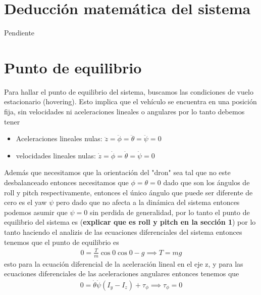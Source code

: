 \documentclass{uofa-eng-assignment}
\begin{document}

\section{Deducción matemática del sistema}
Pendiente 




\section{Punto de equilibrio}
Para hallar el punto de equilibrio del sistema, buscamos las condiciones de vuelo estacionario (hovering). 
Esto implica que el vehículo se encuentra en una posición fija, sin velocidades ni aceleraciones lineales o angulares
por lo tanto debemos tener
\begin{itemize}
    \item Aceleraciones lineales nulas: $\ddot{z}=\ddot{\phi}=\ddot{\theta}=\ddot{\psi}=0$
    \item velocidades lineales nulas: $\dot{z}=\dot{\phi}=\dot{\theta}=\dot{\psi}=0$
\end{itemize}
Además que necesitamos que la orientación del "dron" sea tal que no este desbalanceado entonces 
necesitamos que $\phi=\theta=0$ dado que son los ángulos de roll y pitch respectivamente, 
entonces el único ángulo que puede ser diferente de cero es el yaw $\psi$ 
pero dado que no afecta a la dinámica del sistema entonces podemos asumir que $\psi=0$ 
sin perdida de generalidad, por lo tanto el punto de equilibrio del sistema 
es (\textbf{explicar que es roll y pitch en la sección 1})
por lo tanto haciendo el analizis de las ecuaciones diferenciales del sistema entonces tenemos que el punto de equilibrio es
\begin{align*}
    0= \frac{T}{m} \cos 0 \cos 0 - g \implies T=mg
\end{align*}
esto para la ecuación diferencial de la aceleración lineal en el eje z, 
y para las ecuaciones diferenciales de las aceleraciones angulares entonces tenemos que
\begin{align*}
    0 = \dot{\theta}\dot{\psi}(I_y - I_z) + \tau_\phi \implies \tau_\phi=0 \\
\end{align*}
\end{document}
